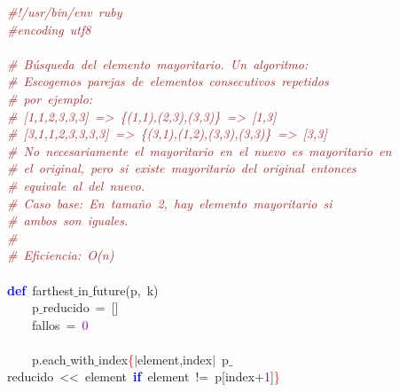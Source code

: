 \noindent
\mbox{}\textit{\textcolor{Brown}{\#!/usr/bin/env\ ruby}} \\
\mbox{}\textit{\textcolor{Brown}{\#encoding\ utf8}} \\
\mbox{} \\
\mbox{}\textit{\textcolor{Brown}{\#\ Búsqueda\ del\ elemento\ mayoritario.\ Un\ algoritmo:}} \\
\mbox{}\textit{\textcolor{Brown}{\#\ Escogemos\ parejas\ de\ elementos\ consecutivos\ repetidos}} \\
\mbox{}\textit{\textcolor{Brown}{\#\ por\ ejemplo:}} \\
\mbox{}\textit{\textcolor{Brown}{\#\ [1,1,2,3,3,3]\ =\textgreater{}\ \{(1,1),(2,3),(3,3)\}\ =\textgreater{}\ [1,3]}} \\
\mbox{}\textit{\textcolor{Brown}{\#\ [3,1,1,2,3,3,3,3]\ =\textgreater{}\ \{(3,1),(1,2),(3,3),(3,3)\}\ =\textgreater{}\ [3,3]}} \\
\mbox{}\textit{\textcolor{Brown}{\#\ No\ necesariamente\ el\ mayoritario\ en\ el\ nuevo\ es\ mayoritario\ en}} \\
\mbox{}\textit{\textcolor{Brown}{\#\ el\ original,\ pero\ si\ existe\ mayoritario\ del\ original\ entonces}} \\
\mbox{}\textit{\textcolor{Brown}{\#\ equivale\ al\ del\ nuevo.}} \\
\mbox{}\textit{\textcolor{Brown}{\#\ Caso\ base:\ En\ tamaño\ 2,\ hay\ elemento\ mayoritario\ si}} \\
\mbox{}\textit{\textcolor{Brown}{\#\ ambos\ son\ iguales.}} \\
\mbox{}\textit{\textcolor{Brown}{\#}} \\
\mbox{}\textit{\textcolor{Brown}{\#\ Eficiencia:\ O(n)}} \\
\mbox{} \\
\mbox{}\textbf{\textcolor{Blue}{def}}\ farthest$\_$in$\_$future\textcolor{BrickRed}{(}p\textcolor{BrickRed}{,}\ k\textcolor{BrickRed}{)} \\
\mbox{}\ \ \ \ p$\_$reducido\ \textcolor{BrickRed}{=}\ \textcolor{BrickRed}{[]} \\
\mbox{}\ \ \ \ fallos\ \textcolor{BrickRed}{=}\ \textcolor{Purple}{0} \\
\mbox{} \\
\mbox{}\ \ \ \ p\textcolor{BrickRed}{.}each$\_$with$\_$index\textcolor{Red}{\{}\textcolor{BrickRed}{$|$}element\textcolor{BrickRed}{,}index\textcolor{BrickRed}{$|$}\ p$\_$reducido\ \textcolor{BrickRed}{\textless{}\textless{}}\ element\ \textbf{\textcolor{Blue}{if}}\ element\ \textcolor{BrickRed}{!=}\ p\textcolor{BrickRed}{[}index\textcolor{BrickRed}{+}\textcolor{Purple}{1}\textcolor{BrickRed}{]}\textcolor{Red}{\}} \\
